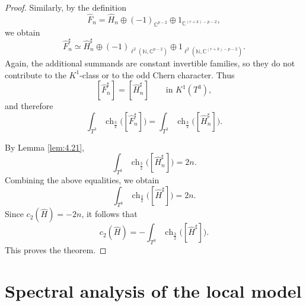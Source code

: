 \documentclass{amsart}
\theoremstyle{definition}
\theoremstyle{remark}
\begin{document}
\begin{proof}
Similarly, by the definition
\[
\hat{F}_n=\hat{H}_n\oplus (-1)_{\mathbb{C}^{p-2}}\oplus 1_{\mathbb{C}^{(r+k)-p-2}},
\]
we obtain
\[
\hat{F}_n^{\sharp}
\simeq
\hat{H}_n^{\sharp}
\oplus (-1)_{\ell^2(\mathbb{N},\mathbb{C}^{p-2})}
\oplus 1_{\ell^2(\mathbb{N},\mathbb{C}^{(r+k)-p-2})}.
\]
Again, the additional summands are constant invertible families, so they do not contribute to the $K^1$-class or to the odd Chern character. Thus
\[
[\hat{F}_n^{\sharp}]
=
[\hat{H}_n^{\sharp}]
\qquad\text{in }K^1(T^3),
\]
and therefore
\[
\int_{T^3} \operatorname{ch}_{\frac{3}{2}}\bigl([\hat{F}_n^{\sharp}]\bigr)
=
\int_{T^3} \operatorname{ch}_{\frac{3}{2}}\bigl([\hat{H}_n^{\sharp}]\bigr).
\]

By Lemma \ref{lem:4.21},
\[
\int_{T^3} \operatorname{ch}_{\frac{3}{2}}\bigl([\hat{H}_n^{\sharp}]\bigr)=2n.
\]
Combining the above equalities, we obtain
\[
\int_{T^3} \operatorname{ch}_{\frac{3}{2}}\bigl([\hat{H}^{\sharp}]\bigr)=2n.
\]
Since $c_2(\hat{H})=-2n$, it follows that
\[
c_2(\hat{H})
=
-\int_{T^3} \operatorname{ch}_{\frac{3}{2}}\bigl([\hat{H}^{\sharp}]\bigr).
\]
This proves the theorem.
\end{proof}


\section{Spectral analysis of the local model}\label{sec:local model}
\end{document}
